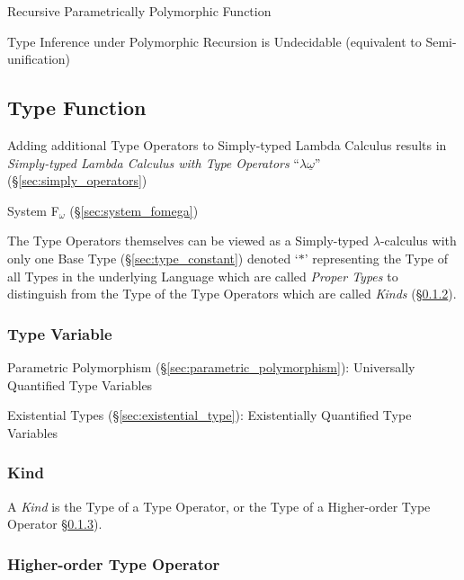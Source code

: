 Recursive Parametrically Polymorphic Function

Type Inference under Polymorphic Recursion is Undecidable (equivalent
to Semi-unification) %



\subsection{Type Function}\label{sec:type_function}

Adding additional Type Operators to Simply-typed Lambda Calculus
results in \emph{Simply-typed Lambda Calculus with Type Operators}
``$\lambda \underline{\omega}$'' (\S\ref{sec:simply_operators})

System F$_{\omega}$ (\S\ref{sec:system_fomega})

The Type Operators themselves can be viewed as a Simply-typed
$\lambda$-calculus with only one Base Type (\S\ref{sec:type_constant})
denoted `$\ast$' representing the Type of all Types in the underlying
Language which are called \emph{Proper Types} to distinguish from the
Type of the Type Operators which are called \emph{Kinds}
(\S\ref{sec:kind}).



\subsubsection{Type Variable}\label{sec:type_variable}

Parametric Polymorphism (\S\ref{sec:parametric_polymorphism}):
Universally Quantified Type Variables

Existential Types (\S\ref{sec:existential_type}):
Existentially Quantified Type Variables



\subsubsection{Kind}\label{sec:kind}

A \emph{Kind} is the Type of a Type Operator, or the Type of a
Higher-order Type Operator \S\ref{sec:higherorder_typeoperator}).



\subsubsection{Higher-order Type Operator}
\label{sec:higherorder_typeoperator}

